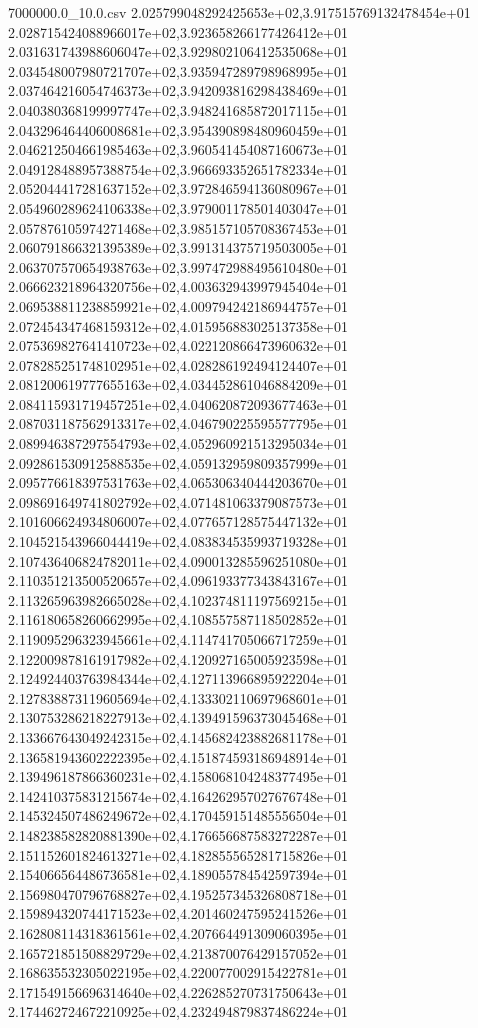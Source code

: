 \begin{filecontents*}{7000000.0_10.0.csv}
2.025799048292425653e+02,3.917515769132478454e+01
2.028715424088966017e+02,3.923658266177426412e+01
2.031631743988606047e+02,3.929802106412535068e+01
2.034548007980721707e+02,3.935947289798968995e+01
2.037464216054746373e+02,3.942093816298438469e+01
2.040380368199997747e+02,3.948241685872017115e+01
2.043296464406008681e+02,3.954390898480960459e+01
2.046212504661985463e+02,3.960541454087160673e+01
2.049128488957388754e+02,3.966693352651782334e+01
2.052044417281637152e+02,3.972846594136080967e+01
2.054960289624106338e+02,3.979001178501403047e+01
2.057876105974271468e+02,3.985157105708367453e+01
2.060791866321395389e+02,3.991314375719503005e+01
2.063707570654938763e+02,3.997472988495610480e+01
2.066623218964320756e+02,4.003632943997945404e+01
2.069538811238859921e+02,4.009794242186944757e+01
2.072454347468159312e+02,4.015956883025137358e+01
2.075369827641410723e+02,4.022120866473960632e+01
2.078285251748102951e+02,4.028286192494124407e+01
2.081200619777655163e+02,4.034452861046884209e+01
2.084115931719457251e+02,4.040620872093677463e+01
2.087031187562913317e+02,4.046790225595577795e+01
2.089946387297554793e+02,4.052960921513295034e+01
2.092861530912588535e+02,4.059132959809357999e+01
2.095776618397531763e+02,4.065306340444203670e+01
2.098691649741802792e+02,4.071481063379087573e+01
2.101606624934806007e+02,4.077657128575447132e+01
2.104521543966044419e+02,4.083834535993719328e+01
2.107436406824782011e+02,4.090013285596251080e+01
2.110351213500520657e+02,4.096193377343843167e+01
2.113265963982665028e+02,4.102374811197569215e+01
2.116180658260662995e+02,4.108557587118502852e+01
2.119095296323945661e+02,4.114741705066717259e+01
2.122009878161917982e+02,4.120927165005923598e+01
2.124924403763984344e+02,4.127113966895922204e+01
2.127838873119605694e+02,4.133302110697968601e+01
2.130753286218227913e+02,4.139491596373045468e+01
2.133667643049242315e+02,4.145682423882681178e+01
2.136581943602222395e+02,4.151874593186948914e+01
2.139496187866360231e+02,4.158068104248377495e+01
2.142410375831215674e+02,4.164262957027676748e+01
2.145324507486249672e+02,4.170459151485556504e+01
2.148238582820881390e+02,4.176656687583272287e+01
2.151152601824613271e+02,4.182855565281715826e+01
2.154066564486736581e+02,4.189055784542597394e+01
2.156980470796768827e+02,4.195257345326808718e+01
2.159894320744171523e+02,4.201460247595241526e+01
2.162808114318361561e+02,4.207664491309060395e+01
2.165721851508829729e+02,4.213870076429157052e+01
2.168635532305022195e+02,4.220077002915422781e+01
2.171549156696314640e+02,4.226285270731750643e+01
2.174462724672210925e+02,4.232494879837486224e+01

\end{filecontents*}
